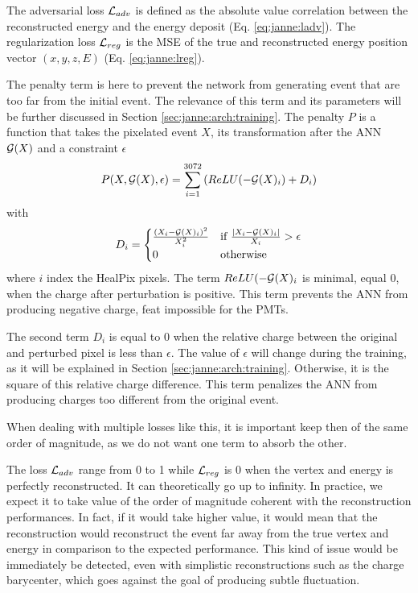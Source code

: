 \documentclass[../main.tex]{subfiles}
\begin{document}
The adversarial loss ${\cal L}_{adv}$ is defined as the absolute value correlation between the reconstructed energy and the energy deposit (Eq. \ref{eq:janne:ladv}). The regularization loss ${\cal L}_{reg}$ is the MSE of the true and reconstructed energy position vector $(x, y, z, E)$ (Eq. \ref{eq:janne:lreg}).

The penalty term is here to prevent the network from generating event that are too far from the initial event. The relevance of this term and its parameters will be further discussed in Section \ref{sec:janne:arch:training}. The penalty $P$ is a function that takes the pixelated event $X$, its transformation after the ANN ${\cal G}(X)$ and a constraint $\epsilon$
\begin{equation}
  P(X, {\cal G}(X), \epsilon) = \sum_{i=1}^{3072} \left( ReLU(-{\cal G}(X)_i) + D_i \right)
\end{equation}
with
\begin{equation}
  D_i = \begin{cases}
    \frac{(X_i - {\cal G}(X)_i)^2}{X_i^2}& \text{if } \frac{|X_i - {\cal G}(X)_i|}{X_i} > \epsilon \\
    0& \text{otherwise}
  \end{cases}
\end{equation}
where $i$ index the HealPix pixels. The term $ReLU(-{\cal G}(X)_i$ is minimal, equal 0, when the charge after perturbation is positive. This term prevents the ANN from producing negative charge, feat impossible for the PMTs.

The second term $D_i$ is equal to 0 when the relative charge between the original and perturbed pixel is less than $\epsilon$. The value of $\epsilon$ will change during the training, as it will be explained in Section \ref{sec:janne:arch:training}. Otherwise, it is the square of this relative charge difference. This term penalizes the ANN from producing charges too different from the original event.
\hfill

When dealing with multiple losses like this, it is important keep then of the same order of magnitude, as we do not want one term to absorb the other.

The loss ${\cal L}_{adv}$ range from 0 to 1 while ${\cal L}_{reg}$ is 0 when the vertex and energy is perfectly reconstructed. It can theoretically go up to infinity. In practice, we expect it to take value of the order of magnitude coherent with the reconstruction performances. In fact, if it would take higher value, it would mean that the reconstruction would reconstruct the event far away from the true vertex and energy in comparison to the expected performance. This kind of issue would be immediately be detected, even with simplistic reconstructions such as the charge barycenter, which goes against the goal of producing subtle fluctuation.
\end{document}
